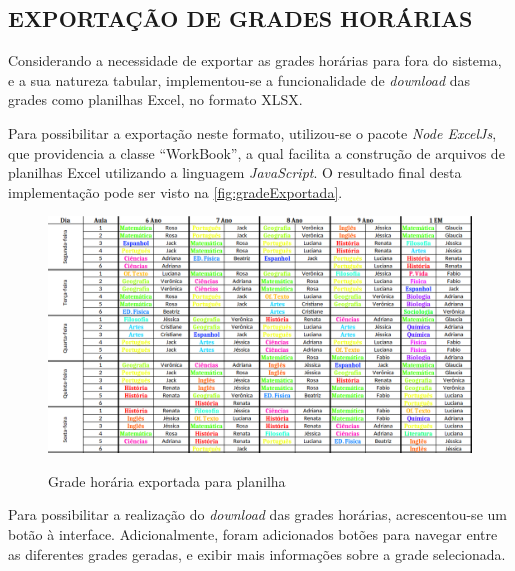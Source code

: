 \subsection{EXPORTAÇÃO DE GRADES HORÁRIAS}

Considerando a necessidade de exportar as grades horárias para fora do sistema, e a sua natureza tabular, implementou-se a funcionalidade de \textit{download} das grades como planilhas Excel, no formato XLSX.

Para possibilitar a exportação neste formato, utilizou-se o pacote \textit{Node ExcelJs}, que providencia a classe ``WorkBook'', a qual facilita a construção de arquivos de planilhas Excel utilizando a linguagem \textit{JavaScript}. O resultado final desta implementação pode ser visto na \autoref{fig:gradeExportada}.

\begin{figure}[!htb]
	\centering
	\caption{Grade horária exportada para planilha}
	\includegraphics[width=1\textwidth]{./dados/figuras/gradeExportada}
	\label{fig:gradeExportada}
\end{figure}

Para possibilitar a realização do \textit{download} das grades horárias, acrescentou-se um botão à interface. Adicionalmente, foram adicionados botões para navegar entre as diferentes grades geradas, e exibir mais informações sobre a grade selecionada.